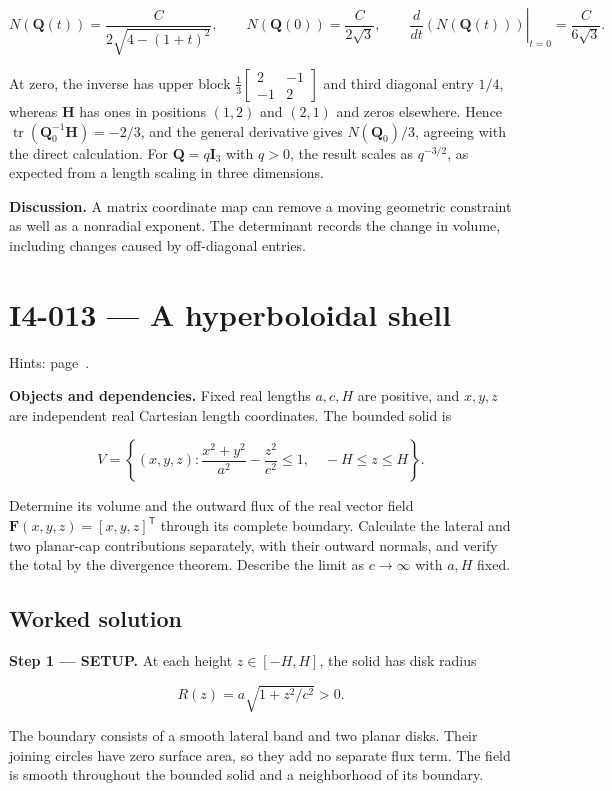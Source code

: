 \documentclass[11pt,oneside,openany]{book}
\begin{document}
\[
N(\mathbf Q(t))=\frac{C}{2\sqrt{4-(1+t)^2}},
\qquad
N(\mathbf Q(0))=\frac{C}{2\sqrt3},
\qquad
\left.\frac{d}{dt}(N(\mathbf Q(t)))\right|_{t=0}=\frac{C}{6\sqrt3}.
\]

At zero, the inverse has upper block \(\frac13\begin{bmatrix}2&-1\\-1&2\end{bmatrix}\) and third diagonal entry \(1/4\), whereas \(\mathbf H\) has ones in positions \((1,2)\) and \((2,1)\) and zeros elsewhere. Hence \(\operatorname{tr}(\mathbf Q_0^{-1}\mathbf H)=-2/3\), and the general derivative gives \(N(\mathbf Q_0)/3\), agreeing with the direct calculation. For \(\mathbf Q=q\mathbf I_3\) with \(q>0\), the result scales as \(q^{-3/2}\), as expected from a length scaling in three dimensions.

\textbf{Discussion.} A matrix coordinate map can remove a moving geometric constraint as well as a nonradial exponent. The determinant records the change in volume, including changes caused by off-diagonal entries.
\clearpage
\section{I4-013 --- A hyperboloidal shell}
\label{problem:I4-013}
{\small Hints: page~\pageref{hints:I4-013}.}\par\medskip

\textbf{Objects and dependencies.} Fixed real lengths \(a,c,H\) are positive, and \(x,y,z\) are independent real Cartesian length coordinates. The bounded solid is

\[
V=\left\{(x,y,z):\frac{x^2+y^2}{a^2}-\frac{z^2}{c^2}\le1,
\quad -H\le z\le H\right\}.
\]

Determine its volume and the outward flux of the real vector field \(\mathbf F(x,y,z)=[x,y,z]^{\mathsf T}\) through its complete boundary. Calculate the lateral and two planar-cap contributions separately, with their outward normals, and verify the total by the divergence theorem. Describe the limit as \(c\to\infty\) with \(a,H\) fixed.
\subsection*{Worked solution}

\textbf{Step 1 --- SETUP.} At each height \(z\in[-H,H]\), the solid has disk radius

\[
R(z)=a\sqrt{1+z^2/c^2}>0.
\]

The boundary consists of a smooth lateral band and two planar disks. Their joining circles have zero surface area, so they add no separate flux term. The field is smooth throughout the bounded solid and a neighborhood of its boundary.
\end{document}
